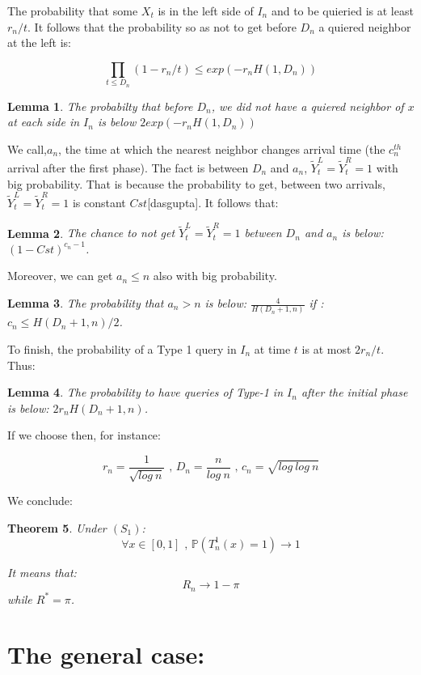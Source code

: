 \documentclass[onecolumn,12pt]{article}
\newtheorem{theorem}{Theorem}[section]
\newtheorem{lemma}[theorem]{Lemma}
\begin{document}
The probability that some $X_t$ is in the left side of $I_n$ and to be quieried is at least $r_n/t$.
It follows that the probability so as not to get before $D_n$ a quiered neighbor at the left is: 

$$\prod_{t\leq D_n} (1-r_n/t) \leq exp(-r_n H(1,D_n))$$

\begin{lemma}
The probabilty that before $D_n$, we did not have a quiered neighbor of $x$ at each side in $I_n$ is below $2exp(-r_n H(1,D_n))$
\end{lemma}


We call,$a_n$, the time at which the nearest neighbor changes arrival time (the $c_n^{th}$ arrival after the first phase). The fact is between $D_n$ and $a_n$, $\tilde{Y}^L_t=\tilde{Y}^R_t=1$ with big probability. That is because the probability to get, between two arrivals, $\tilde{Y}^L_t=\tilde{Y}^R_t=1$ is constant $Cst$[dasgupta]. It follows that:

\begin{lemma}
The chance to not get $\tilde{Y}^L_t=\tilde{Y}^R_t=1$ between $D_n$ and $a_n$ is below: $(1-Cst)^{c_n-1}$.
\end{lemma}

Moreover, we can get $a_n \leq n$ also with big probability.

\begin{lemma}
The probability that $a_n>n$ is below: $\frac{4}{H(D_n+1,n)}$ if : $c_n\leq H(D_n+1,n)/2$.
\end{lemma}

To finish, the probability of a Type 1 query in $I_n$ at time $t$ is at most $2r_n/t$.
Thus:
\begin{lemma}
The probability to have queries of Type-1 in $I_n$ after the initial phase is below: $2r_n H(D_n+1,n)$.
\end{lemma}

If we choose then, for instance:

$$r_n=\frac{1}{\sqrt{log\ n}}\text{ , } D_n=\frac{n}{log\ n} \text{ , } c_n=\sqrt{log\ log\ n}$$

We conclude:

\begin{theorem}
Under $(S_1)$:
$$\forall x \in [0,1] \text{ , } \mathbb{P}(T^1_n(x)=1) \rightarrow 1$$

It means that:
$$R_n \rightarrow 1-\pi$$ while $R^*=\pi$.
\end{theorem}

\section{The general case:}
\end{document}
